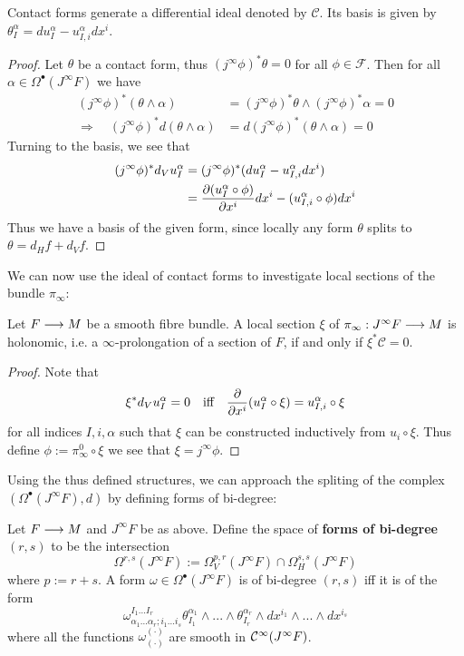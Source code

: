 \begin{theo}
  Contact forms generate a differential ideal denoted by $\mathcal{C}$. Its basis is given by $\theta^\alpha_I = du^\alpha_I - u^\alpha_{I,i} dx^i$.
\begin{proof}
  Let $\theta$ be a contact form, thus $(j^\infty \phi)^* \theta = 0$ for all $\phi \in \mathcal{F}$. Then for all $\alpha \in \Omega^\bullet(J^\infty F)$ we have
  \begin{align}
    (j^\infty \phi)^* (\theta \wedge \alpha) &= (j^\infty \phi)^* \theta \wedge (j^\infty \phi)^* \alpha = 0\\
    \Rightarrow \quad (j^\infty \phi)^* d(\theta \wedge \alpha) &= d(j^\infty \phi)^* (\theta \wedge \alpha) = 0
  \end{align}
  Turning to the basis, we see that
  \begin{align}
    (j^\infty \phi)^* d_V u^\alpha_I &= (j^\infty \phi)^*(du^\alpha_I - u^\alpha_{I,i} dx^i)\\
    &= \dell{(u^\alpha_I \circ \phi)}{x^i} dx^i - (u^\alpha_{I,i} \circ \phi) dx^i
  \end{align}
  Thus we have a basis of the given form, since locally any form $\theta$ splits to $\theta = d_H f + d_V f$.
\end{proof}
\end{theo}

We can now use the ideal of contact forms to investigate local sections of the bundle $\pi_\infty$:

\begin{lem}
  Let $F\longrightarrow M$ be a smooth fibre bundle. A local section $\xi$ of $\pi_\infty: J^\infty F \longrightarrow M$ is holonomic, i.e. a $\infty$-prolongation of a section of $F$, if and only if $\xi^* \mathcal{C} = 0$.
\begin{proof}
  Note that
  $$ \xi^* d_V u^\alpha_I = 0 \quad \text{iff} \quad \frac{\partial }{\partial x^i} (u^\alpha_I \circ \xi) = u^\alpha_{I,i} \circ \xi $$
  for all indices $I,i,\alpha$ such that $\xi$ can be constructed inductively from $u_i \circ \xi$. Thus define $\phi := \pi_\infty^0 \circ \xi$ we see that $\xi = j^\infty \phi$.
\end{proof}
\end{lem}

Using the thus defined structures, we can approach the spliting of the complex $(\Omega^\bullet(J^\infty F), d)$ by defining forms of bi-degree:

\begin{definition}
  Let $F \longrightarrow M$ and $J^\infty F$ be as above. Define the space of \textbf{forms of bi-degree $(r,s)$} to be the intersection
  $$ \Omega^{r,s}(J^\infty F) := \Omega_V^{p,r}(J^\infty F) \cap \Omega_H^{s,s}(J^\infty F) $$
  where $p:= r+s$. A form $\omega \in \Omega^\bullet(J^\infty F)$ is of bi-degree $(r,s)$ iff it is of the form
  $$ \omega^{I_1 ... I_r}_{\alpha_1 ... \alpha_r ; i_1 ... i_s} \theta^{\alpha_1}_{I_1} \wedge ... \wedge \theta^{\alpha_r}_{I_r} \wedge dx^{i_1} \wedge ... \wedge dx^{i_s}$$
  where all the functions $\omega^{(\cdot)}_{(\cdot)}$ are smooth in $\mathcal{C}^{\infty}(J^\infty F)$.
\end{definition}

